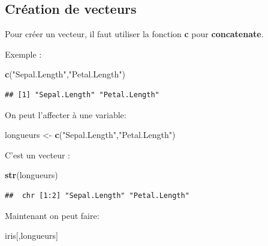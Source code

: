\documentclass[
]{book}
\newenvironment{Shaded}{\begin{snugshade}}{\end{snugshade}}
\newcommand{\FunctionTok}[1]{\textcolor[rgb]{0.13,0.29,0.53}{\textbf{#1}}}
\newcommand{\NormalTok}[1]{#1}
\newcommand{\OtherTok}[1]{\textcolor[rgb]{0.56,0.35,0.01}{#1}}
\newcommand{\StringTok}[1]{\textcolor[rgb]{0.31,0.60,0.02}{#1}}
\begin{document}
\subsection{Création de vecteurs}\label{cruxe9ation-de-vecteurs}

Pour créer un vecteur, il faut utiliser la fonction \textbf{c} pour \textbf{concatenate}.

Exemple :

\begin{Shaded}
\begin{Highlighting}[]
\FunctionTok{c}\NormalTok{(}\StringTok{"Sepal.Length"}\NormalTok{,}\StringTok{"Petal.Length"}\NormalTok{)}
\end{Highlighting}
\end{Shaded}

\begin{verbatim}
## [1] "Sepal.Length" "Petal.Length"
\end{verbatim}

On peut l'affecter à une variable:

\begin{Shaded}
\begin{Highlighting}[]
\NormalTok{longueurs }\OtherTok{\textless{}{-}} \FunctionTok{c}\NormalTok{(}\StringTok{"Sepal.Length"}\NormalTok{,}\StringTok{"Petal.Length"}\NormalTok{)}
\end{Highlighting}
\end{Shaded}

C'est un vecteur :

\begin{Shaded}
\begin{Highlighting}[]
\FunctionTok{str}\NormalTok{(longueurs)}
\end{Highlighting}
\end{Shaded}

\begin{verbatim}
##  chr [1:2] "Sepal.Length" "Petal.Length"
\end{verbatim}

Maintenant on peut faire:

\begin{Shaded}
\begin{Highlighting}[]
\NormalTok{iris[,longueurs]}
\end{Highlighting}
\end{Shaded}
\end{document}
